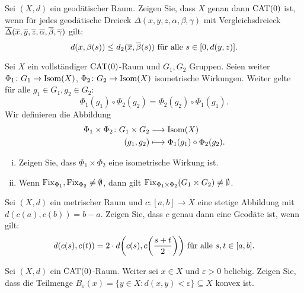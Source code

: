 	\begin{aufgabe}
		\label{aufg:3.2}	
		Sei $(X,d)$ ein geodätischer Raum.
		Zeigen Sie, dass $X$ genau dann $\operatorname{CAT(0)}$ ist, wenn für jedes geodätische Dreieck $\Delta(x,y,z,\alpha,\beta,\gamma)$ mit Vergleichsdreieck $\overline{\Delta}(\overline{x},\overline{y},\overline{z},\overline{\alpha},\overline{\beta},\overline{\gamma})$ gilt:
		\[
			d(x,\beta(s)) \leq d_2(\overline{x},\overline{\beta}(s)) \text{ für alle } s \in [0,d(y,z)].
		\]
	\end{aufgabe}
	\newpage
	\begin{aufgabe}
		\label{aufg:3.3}	
		Sei $X$ ein vollständiger $\operatorname{CAT(0)}$-Raum und $G_1, G_2$ Gruppen. 
		Seien weiter $\Phi_1\colon G_1 \rightarrow \operatorname{Isom}(X)$, $\Phi_2\colon G_2 \rightarrow \operatorname{Isom}(X)$ isometrische Wirkungen.
		Weiter gelte für alle $g_1 \in G_1, g_2 \in G_2$:
		\[
			\Phi_1(g_1) \circ \Phi_2(g_2) = \Phi_2(g_2) \circ \Phi_1(g_1).
		\]
		Wir definieren die Abbildung
		\begin{align*}
			\Phi_1 \times \Phi_2 \colon G_1 \times G_2 &\longrightarrow \operatorname{Isom}(X) \\
			(g_1,g_2) &\longmapsto \Phi_1(g_1) \circ \Phi_2(g_2).
		\end{align*}
		\begin{enumerate}[(i)]
			\item Zeigen Sie, dass $\Phi_1 \times \Phi_2$ eine isometrische Wirkung ist.
			\item Wenn $\operatorname{Fix}_{\Phi_1}, \operatorname{Fix}_{\Phi_2} \neq \emptyset$, dann gilt $\operatorname{Fix}_{\Phi_1 \times \Phi_2}(G_1 \times G_2) \neq \emptyset$.
		\end{enumerate}
	\end{aufgabe}
	
	\begin{aufgabe}
		\label{aufg:3.4}
		Sei $(X,d)$ ein metrischer Raum und $c \colon [a,b] \rightarrow X$ eine stetige Abbildung mit $d(c(a),c(b)) = b-a$.
		Zeigen Sie, dass $c$ genau dann eine Geodäte ist, wenn gilt:
		\[
			d(c(s),c(t)) = 2 \cdot d\enbrace*{c(s),c \enbrace*{\frac{s+t}{2}}} \text{ für alle } s,t \in [a,b].
		\]
	\end{aufgabe}
	
	\begin{aufgabe}
		\label{aufg:4.1}	
		Sei $(X,d)$ ein $\operatorname{CAT(0)}$-Raum.
		Weiter sei $x \in X$ und $\varepsilon > 0$ beliebig.
		Zeigen Sie, dass die Teilmenge $B_\varepsilon(x) = \{y \in X : d(x,y) < \varepsilon\} \subseteq X$ konvex ist.
	\end{aufgabe}
	
